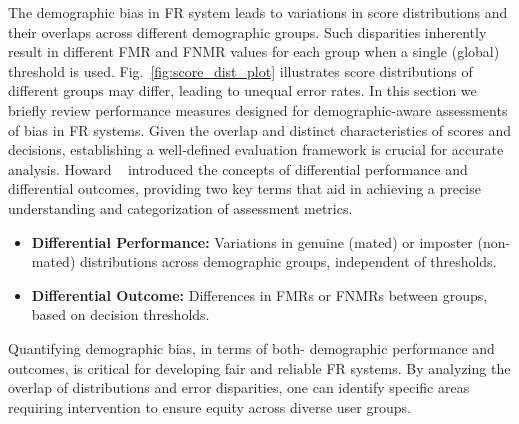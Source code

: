 The demographic bias in FR system leads to variations in score distributions
and their overlaps across different demographic groups. Such disparities inherently
result in different FMR and FNMR values for each group when a single (global)
threshold is used. Fig.~\ref{fig:score_dist_plot} illustrates score
distributions of different groups may differ, leading to unequal error rates.
In this section we briefly review performance measures designed for
demographic-aware assessments of bias in FR systems.
%
Given the overlap and distinct characteristics of scores and decisions, 
establishing a well-defined evaluation framework is crucial for accurate analysis.
Howard \etal~\cite{howard2019effect} introduced the concepts of differential
performance and differential outcomes, providing two key terms that aid in
achieving a precise understanding and categorization of assessment metrics.

\begin{itemize}
\item \textbf{Differential Performance:} Variations in genuine (mated) or
imposter (non-mated) distributions across demographic groups, independent of
thresholds.
\item \textbf{Differential Outcome:} Differences in FMRs or FNMRs between
groups, based on decision thresholds.
\end{itemize}

Quantifying demographic bias, in terms of both- demographic performance and
outcomes, is critical for developing fair and reliable FR systems. By analyzing
the overlap of distributions and error disparities, one can identify specific
areas requiring intervention to ensure equity across diverse user groups.

